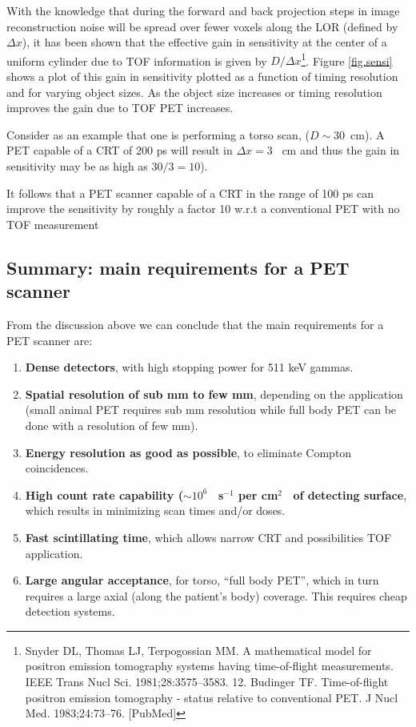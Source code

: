 With the knowledge that during the forward and back projection steps in image reconstruction noise will be spread over fewer voxels along the LOR (defined by $\Delta x$), it has been  shown  that the effective gain in sensitivity at the center of a uniform cylinder due to TOF information is given by $D/\Delta x$\footnote{ Snyder DL, Thomas LJ, Terpogossian MM. A mathematical model for positron emission tomography systems having time-of-flight measurements. IEEE Trans Nucl Sci. 1981;28:3575–3583.
12. Budinger TF. Time-of-flight positron emission tomography - status relative to conventional PET. J Nucl Med. 1983;24:73–76. [PubMed]}. Figure \ref{fig.sensi} shows a plot of this gain in sensitivity plotted as a function of timing resolution and for varying object sizes. As the object size increases or timing resolution improves the gain due to TOF PET increases. 

Consider as an example that one is performing a torso scan, ($D \sim 30$~cm). A PET capable of a CRT of 200 ps will result in $\Delta x = 3$~ cm and thus the gain in sensitivity may be as high as $30/3 = 10$). 
  
It follows that a PET scanner capable of a CRT in the range of 100 ps can improve the sensitivity by roughly a factor 10 w.r.t a conventional PET with no TOF measurement 


\subsection{Summary: main requirements for a PET scanner}

From the discussion above we can conclude that the 
main requirements for a PET scanner are: 

\begin{enumerate}
\item {\bf Dense detectors}, with high stopping power for 511 keV gammas.
\item {\bf Spatial resolution of sub mm to few mm}, depending on the application (small animal PET requires sub mm resolution while full body PET can be done with a resolution of few mm).
\item {\bf Energy resolution as good as possible}, to eliminate Compton coincidences.
\item {\bf High count rate capability ($\sim10^6$~ s$^{-1}$ per cm$^2$~ of detecting surface}, which results in minimizing scan times and/or doses.
\item {\bf Fast scintillating time}, which allows narrow CRT and possibilities TOF application. 
\item {\bf Large angular acceptance}, for torso, ``full body PET'', which in turn requires a large axial (along the patient's body) coverage. This requires cheap detection systems. 
\end{enumerate}